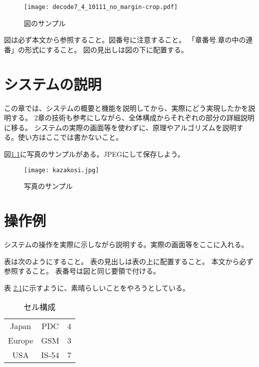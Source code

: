 \documentclass[12pt]{jreport}
\begin{document}
\begin{figure}[htb]
    \begin{center}
        \texttt{[image: decode7\_4\_10111\_no\_margin-crop.pdf]}
    \end{center}
    \caption{図のサンプル
        \label{fig:pm1}
    }
\end{figure}

図は必ず本文から参照すること。図番号に注意すること。
「章番号.章の中の連番」の形式にすること。
図の見出しは図の下に配置する。

\chapter{システムの説明}
この章では、システムの概要と機能を説明してから、実際にどう実現したかを説明する。
2章の技術も参考にしながら、全体構成からそれぞれの部分の詳細説明に移る。
システムの実際の画面等を使わずに、原理やアルゴリズムを説明する。使い方はここでは書かないこと。

図\ref{fig:pm2}に写真のサンプルがある。JPEGにして保存しよう。

\begin{figure}[htb]
    \begin{center}
        \texttt{[image: kazakosi.jpg]}
    \end{center}
    \caption{写真のサンプル
        \label{fig:pm2}
    }
\end{figure}

\chapter{操作例}
システムの操作を実際に示しながら説明する。実際の画面等をここに入れる。

表は次のようにすること。
表の見出しは表の上に配置すること。
本文から必ず参照すること。
表番号は図と同じ要領で付ける。

表 \ref{tab:c1}に示すように、素晴らしいことをやろうとしている。

\begin{table}[htb]
    \caption{セル構成
        \label{tab:c1}
    }
    \begin{center}
        \begin{tabular}{ccc}
            \hline
            Japan  & PDC   & 4 \\
            Europe & GSM   & 3 \\
            USA    & IS-54 & 7 \\
            \hline
        \end{tabular}
    \end{center}
\end{table}
\end{document}
